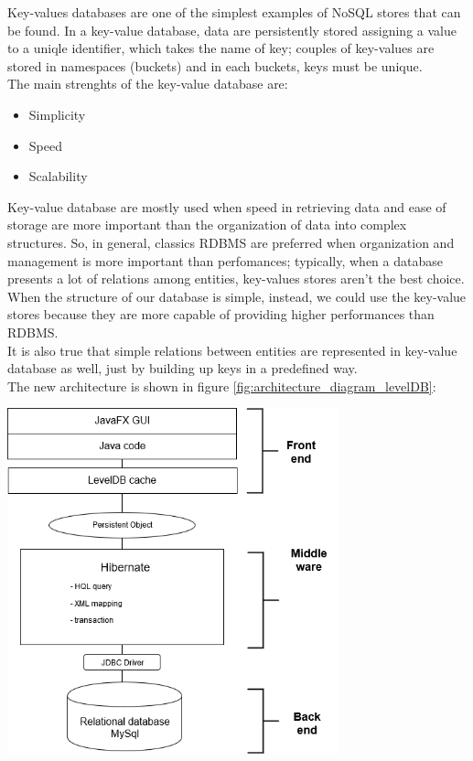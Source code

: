 \documentclass[a4paper, oneside]{article}
\begin{document}
Key-values databases are one of the simplest examples of NoSQL stores that can be found. In a key-value database, data are persistently stored assigning a value to a uniqle identifier, which takes the name of key; couples of key-values are stored in namespaces (buckets) and in each buckets, keys must be unique. \\
The main strenghts of the key-value database are: 
\begin{itemize}
\item Simplicity
\item Speed 
\item Scalability
\end{itemize}
Key-value database are mostly used when speed in retrieving data and ease of storage are more important than the organization of data into complex structures. So, in general, classics RDBMS are preferred when organization and management is more important than perfomances; typically, when a database presents a lot of relations among entities, key-values stores aren’t the best choice. When the structure of our database is simple, instead, we could use the key-value stores because they are more capable of providing higher performances than RDBMS.\\
It is also true that simple relations between entities are represented in key-value database as well, just by building up keys in a predefined way.\\
The new architecture is shown in figure \ref{fig:architecture_diagram_levelDB}:\\
\begin{minipage}{\linewidth}
\begin{center}
\vspace{7mm}
\includegraphics[height = 100mm]{./images/diagrams/architectureLevelDB.png} 
\vspace{6mm}
\label{fig:architecture_diagram_levelDB}
\vspace{6mm}
\end{center}
\end{minipage}
\end{document}
